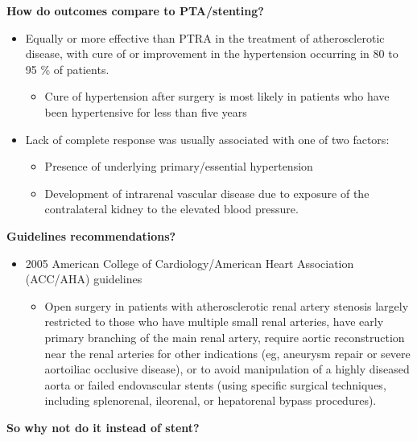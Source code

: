 \documentclass[
]{book}
\providecommand{\tightlist}{%
  \setlength{\itemsep}{0pt}\setlength{\parskip}{0pt}}
\begin{document}
\textbf{How do outcomes compare to PTA/stenting?}

\begin{itemize}
\item
  Equally or more effective than PTRA in the treatment of
  atherosclerotic disease, with cure of or improvement in the
  hypertension occurring in 80 to 95 \% of patients.

  \begin{itemize}
  \tightlist
  \item
    Cure of hypertension after surgery is most likely in patients
    who have been hypertensive for less than five years
  \end{itemize}
\item
  Lack of complete response was usually associated with one of two
  factors:

  \begin{itemize}
  \item
    Presence of underlying primary/essential hypertension
  \item
    Development of intrarenal vascular disease due to exposure of
    the contralateral kidney to the elevated blood pressure.
  \end{itemize}
\end{itemize}

\textbf{Guidelines recommendations?}

\begin{itemize}
\item
  2005 American College of Cardiology/American Heart Association
  (ACC/AHA) guidelines \citep{hirschACCAHA20052006}

  \begin{itemize}
  \tightlist
  \item
    Open surgery in patients with atherosclerotic renal artery
    stenosis largely restricted to those who have multiple small
    renal arteries, have early primary branching of the main renal
    artery, require aortic reconstruction near the renal arteries
    for other indications (eg, aneurysm repair or severe aortoiliac
    occlusive disease), or to avoid manipulation of a highly
    diseased aorta or failed endovascular stents (using specific
    surgical techniques, including splenorenal, ileorenal, or
    hepatorenal bypass procedures).
  \end{itemize}
\end{itemize}

\textbf{So why not do it instead of stent?}
\end{document}

